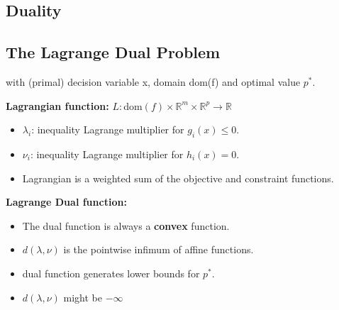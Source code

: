 \documentclass[8pt,a4paper]{scrartcl}
\begin{document}
\begin{multicols*}{3}
\section{Duality}

\subsection{The Lagrange Dual Problem}


with (primal) decision variable x, domain dom(f) and optimal value $p^\ast$.

\finn

\textbf{Lagrangian function:} $L:$dom$(f)\times\mathbb{R}^m\times\mathbb{R}^p\rightarrow\mathbb{R}$


\begin{itemize}
\ncompaq
\item $\lambda_i$: inequality Lagrange multiplier for $g_i(x)\leq 0$.
\item $\nu_i$: inequality Lagrange multiplier for $h_i(x)=0$.
\item Lagrangian is a weighted sum of the objective and constraint functions.
\end{itemize}

\textbf{Lagrange Dual function:}

\finn


\begin{itemize}
\ncompaq
\item The dual function is always a \textbf{convex} function.
\item $d(\lambda,\nu)$ is the pointwise infimum of affine functions.
\item dual function generates lower bounds for $p^\ast$.

\item $d(\lambda,\nu)$ might be $-\infty$


\end{itemize}
\end{multicols*}
\end{document}
